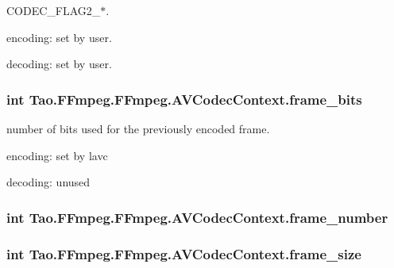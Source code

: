 \label{struct_tao_1_1_f_fmpeg_1_1_f_fmpeg_1_1_a_v_codec_context_a28bb12c9c401b6240677df9f54ca88d1}
CODEC\_\-FLAG2\_\-$\ast$.
\begin{DoxyItemize}
\item encoding: set by user.
\item decoding: set by user. 
\end{DoxyItemize}\hypertarget{struct_tao_1_1_f_fmpeg_1_1_f_fmpeg_1_1_a_v_codec_context_aded5b1c671d254c88153f79fd47f01ee}{
\subsubsection[{frame\_\-bits}]{\setlength{\rightskip}{0pt plus 5cm}int {\bf Tao.FFmpeg.FFmpeg.AVCodecContext.frame\_\-bits}}}
\label{struct_tao_1_1_f_fmpeg_1_1_f_fmpeg_1_1_a_v_codec_context_aded5b1c671d254c88153f79fd47f01ee}
number of bits used for the previously encoded frame.
\begin{DoxyItemize}
\item encoding: set by lavc
\item decoding: unused 
\end{DoxyItemize}\hypertarget{struct_tao_1_1_f_fmpeg_1_1_f_fmpeg_1_1_a_v_codec_context_a6a8545eb60bdc6417a0419c87f1dffe7}{
\subsubsection[{frame\_\-number}]{\setlength{\rightskip}{0pt plus 5cm}int {\bf Tao.FFmpeg.FFmpeg.AVCodecContext.frame\_\-number}}}
\label{struct_tao_1_1_f_fmpeg_1_1_f_fmpeg_1_1_a_v_codec_context_a6a8545eb60bdc6417a0419c87f1dffe7}
\hypertarget{struct_tao_1_1_f_fmpeg_1_1_f_fmpeg_1_1_a_v_codec_context_af3893a4c2663a5a1ff6a4a59a5335312}{
\subsubsection[{frame\_\-size}]{\setlength{\rightskip}{0pt plus 5cm}int {\bf Tao.FFmpeg.FFmpeg.AVCodecContext.frame\_\-size}}}
